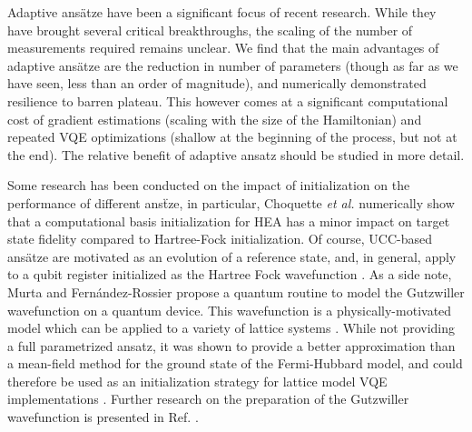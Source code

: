 Adaptive ans{\"{a}}tze have been a significant focus of recent research. While they have brought several critical breakthroughs, the scaling of the number of measurements required remains unclear. We find that the main advantages of adaptive ans{\"{a}}tze are the reduction in number of parameters (though as far as we have seen, less than an order of magnitude), and numerically demonstrated resilience to barren plateau. This however comes at a significant computational cost of gradient estimations (scaling with the size of the Hamiltonian) and repeated VQE optimizations (shallow at the beginning of the process, but not at the end). The relative benefit of adaptive ansatz should be studied in more detail.

Some research has been conducted on the impact of initialization on the performance of different ans\"tze, in particular, Choquette \textit{et al.} \cite{Choquette2021} numerically show that a computational basis initialization for HEA has a minor impact on target state fidelity compared to Hartree-Fock initialization. Of course, UCC-based ans\"atze are motivated as an evolution of a reference state, and, in general, apply to a qubit register initialized as the Hartree Fock wavefunction \cite{Peruzzo2014}. As a side note, Murta and Fern\'andez-Rossier \cite{Murta2021} propose a quantum routine to model the Gutzwiller wavefunction \cite{Gutzwiller1963} on a quantum device. This wavefunction is a physically-motivated model which can be applied to a variety of lattice systems \cite{Hubbard1963}. While not providing a full parametrized ansatz, it was shown to provide a better approximation than a mean-field method for the ground state of the Fermi-Hubbard model, and could therefore be used as an initialization strategy for lattice model VQE implementations \cite{Murta2021}. Further research on the preparation of the Gutzwiller wavefunction is presented in Ref. \cite{Seki2022}.





